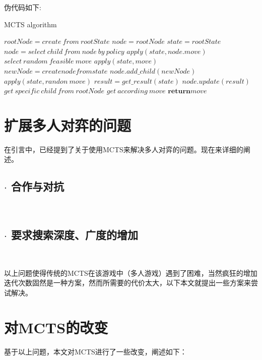 \documentclass[9pt,twocolumn,twoside]{osajnl}
\begin{document}
伪代码如下:
\begin{algorithm}
	\caption{MCTS algorithm}\label{alg:MCTS}
	\begin{algorithmic}[1]
		\State $rootNode = create \ from \ rootState $
		\State $node = rootNode$
		\State $state = rootState$
		\State $node = select \ child \ from \ node \ by \ policy$
		\State $apply(state,node.move)$ 
		\EndWhile
		\State $select \ random \ feasible \ move$
		\State $apply(state,move)$
		\State $newNode = create node from state$
		\State $node.add\_child(newNode)$ 
		\State $apply(state, randon \ move)$ 
		\EndWhile
		\State $result = get\_result(state)$
		\State $node.update(result)$
		\EndWhile
		\EndWhile
		\State $get \ specific \ child \ from \ rootNode$
		\State $get \ according \ move$
		\State $\textbf{return} move$
		\EndProcedure
	\end{algorithmic}
\end{algorithm}

\section{扩展多人对弈的问题}
在引言中，已经提到了关于使用MCTS来解决多人对弈的问题。现在来详细的阐述。
\subsection{$\cdot$ 合作与对抗}
\begin{adjustwidth}{2em}{}
	\ \ \ \ \
	
\end{adjustwidth}
\subsection{$\cdot$ 要求搜索深度、广度的增加}
\begin{adjustwidth}{2em}{}
	\ \ \ \ \
	
\end{adjustwidth}

以上问题使得传统的MCTS在该游戏中（多人游戏）遇到了困难，当然疯狂的增加迭代次数固然是一种方案，然而所需要的代价太大，以下本文就提出一些方案来尝试解决。

\section{对MCTS的改变}
基于以上问题，本文对MCTS进行了一些改变，阐述如下：
\end{document}
